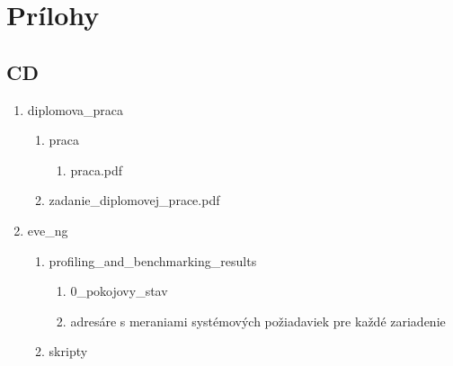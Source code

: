 \chapter{Prílohy}
\label{chap:prilohy}





\section{CD}
\label{chap:cd}


\begin{enumerate}[noitemsep,label*=\thesection.\arabic*.]
    \item diplomova\_praca
    
    \begin{enumerate}[noitemsep,label*=\arabic*.]
        \item praca
        
        \begin{enumerate}[noitemsep,label*=\arabic*.]
            \item praca.pdf
        \end{enumerate}
        
        \item zadanie\_diplomovej\_prace.pdf
    \end{enumerate}
    
    \item \label{item:prilohy_cd_eve_ng_adresar} eve\_ng
    
    \begin{enumerate}[noitemsep,label*=\arabic*.]
        \item profiling\_and\_benchmarking\_results
        
        \begin{enumerate}[noitemsep,label*=\arabic*.]
            \item 0\_pokojovy\_stav
            \item \label{item:all_benchmarks} adresáre s meraniami systémových požiadaviek pre každé zariadenie
        \end{enumerate}
        
        \item \label{item:skripty} skripty
        

\end{enumerate}
\end{enumerate}
